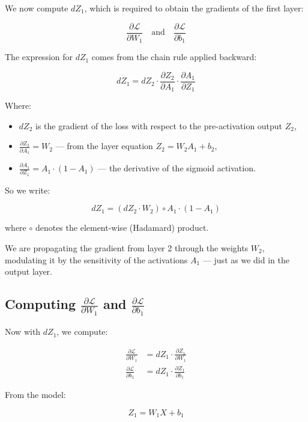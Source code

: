 \documentclass[11pt]{article}
\begin{document}
We now compute \( dZ_1 \), which is required to obtain the gradients of the first layer:

\[
\frac{\partial \mathcal{L}}{\partial W_1} \quad \text{and} \quad \frac{\partial \mathcal{L}}{\partial b_1}
\]

The expression for \( dZ_1 \) comes from the chain rule applied backward:

\[
dZ_1 = dZ_2 \cdot \frac{\partial Z_2}{\partial A_1} \cdot \frac{\partial A_1}{\partial Z_1}
\]

Where:
\begin{itemize}
  \item \( dZ_2 \) is the gradient of the loss with respect to the pre-activation output \( Z_2 \),
  \item \( \frac{\partial Z_2}{\partial A_1} = W_2 \) — from the layer equation \( Z_2 = W_2 A_1 + b_2 \),
  \item \( \frac{\partial A_1}{\partial Z_1} = A_1 \cdot (1 - A_1) \) — the derivative of the sigmoid activation.
\end{itemize}

So we write:

\[
\boxed{
dZ_1 = (dZ_2 \cdot W_2) \circ A_1 \cdot (1 - A_1)
}
\]

where \( \circ \) denotes the element-wise (Hadamard) product.

\begin{insightbox}[title=Interpretation]
We are propagating the gradient from layer 2 through the weights \( W_2 \),  
modulating it by the sensitivity of the activations \( A_1 \) — just as we did in the output layer.
\end{insightbox}

\subsection{Computing $\frac{\partial \mathcal{L}}{\partial W_1}$ and $\frac{\partial \mathcal{L}}{\partial b_1}$}

Now with \( dZ_1 \), we compute:

\[
\begin{aligned}
\frac{\partial \mathcal{L}}{\partial W_1} &= dZ_1 \cdot \frac{\partial Z_1}{\partial W_1} \\
\frac{\partial \mathcal{L}}{\partial b_1} &= dZ_1 \cdot \frac{\partial Z_1}{\partial b_1}
\end{aligned}
\]

From the model:

\[
Z_1 = W_1 X + b_1
\]
\end{document}
